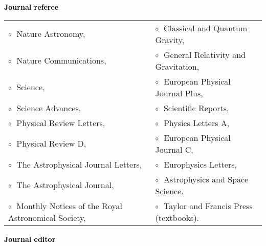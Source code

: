 \textbf{\textcolor{black}{Journal referee}}\vspace{0.1cm}\\
\begin{tabular}{@{\hskip 0.4cm}l@{\hskip 0.4in}l}
$\circ\;$ Nature Astronomy,  & $\circ\;$  Classical and Quantum Gravity,   \\
$\circ\;$ Nature Communications,  & $\circ\;$   General Relativity and Gravitation,  \\
$\circ\;$ Science, & $\circ\;$  European Physical Journal Plus,  \\
$\circ\;$ Science Advances, & $\circ\;$ Scientific Reports, \\
$\circ\;$ Physical Review Letters, & $\circ\;$ Physics Letters A, \\
$\circ\;$ Physical Review D,  & $\circ\;$ European Physical Journal C,  \\
$\circ\;$  The Astrophysical Journal Letters,  &  $\circ\;$  Europhysics Letters, \\
$\circ\;$ The Astrophysical Journal,  &  $\circ\;$ Astrophysics and Space Science. \\
$\circ\;$  Monthly Notices of the Royal Astronomical Society, & $\circ\;$ Taylor and Francis Press (textbooks). \\
\end{tabular}
\vspace{0.2cm}

 \textbf{\textcolor{black}{Journal editor}}\vspace{0.1cm}\\
 \vspace{-0.1cm}
\vspace{0.2cm}


